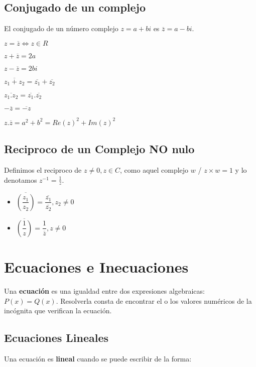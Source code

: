 \documentclass[10pt]{article}
\begin{document}
\subsection{Conjugado de un complejo}
El conjugado de un número complejo $z=a+bi$ es $\overline{z}=a-bi$.
\begin{itemize}
\begin{multicols}{3}
\item $z = \overline{z} \iff z \in R$
\item $z + \overline{z} = 2a$
\item $z - \overline{z} = 2bi$
\item $\overline{z_1 + z_2} = \overline{z_1} + \overline{z_2}$
\item $\overline{z_1 . z_2} = \overline{z_1} . \overline{z_2}$
\item $- \overline{z} = \overline{-z}$
\item $z . \overline{z} = a^2 + b^2 = Re(z)^2 + Im(z)^2$
\end{multicols}
\end{itemize}
\subsection{Reciproco de un Complejo NO nulo}
Definimos el reciproco de $z \not = 0, z \in C$, como aquel complejo $w$ / $z \times w=1$ y lo denotamos $z^{-1} = \frac{1}{z}$.
\begin{multicols}{2}
\begin{itemize}
\item $\overline{\left(\dfrac{z_1}{z_2}\right)} = \dfrac{\overline{z_1}}{\overline{z_2}}, z_2 \not = 0$
\item $\overline{\left(\dfrac{1}{z}\right)} = \dfrac{1}{\overline{z}}, z \not = 0$
\end{itemize}
\end{multicols}

\newpage
\section{Ecuaciones e Inecuaciones}
Una \textbf{ecuación} es una igualdad entre dos expresiones algebraicas: $P(x)=Q(x)$. Resolverla consta de encontrar el o los valores numéricos de la incógnita que verifican la ecuación.
\subsection{Ecuaciones Lineales}
Una ecuación es \textbf{lineal} cuando se puede escribir de la forma: \hfill {}
\end{document}
